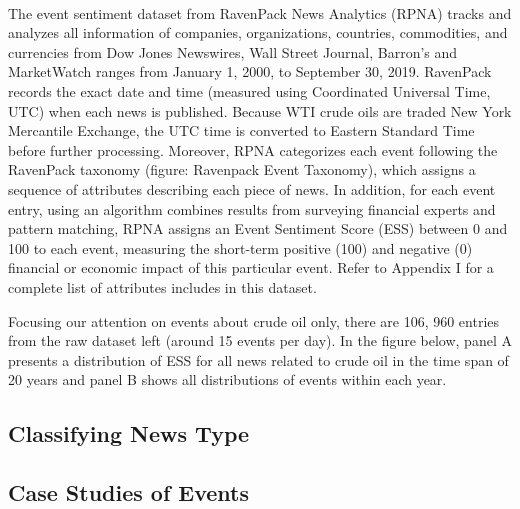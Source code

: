 \documentclass[12pt]{article}
\begin{document}
	\paragraph{} The event sentiment dataset from RavenPack News Analytics (RPNA) tracks and analyzes all information of companies, organizations, countries, commodities, and currencies from Dow Jones Newswires, Wall Street Journal, Barron’s and MarketWatch ranges from January 1, 2000, to September 30, 2019. RavenPack records the exact date and time (measured using Coordinated Universal Time, UTC)  when each news is published. Because WTI crude oils are traded New York Mercantile Exchange, the UTC time is converted to Eastern Standard Time before further processing. Moreover, RPNA categorizes each event following the RavenPack taxonomy (figure: Ravenpack Event Taxonomy), which assigns a sequence of attributes describing each piece of news. In addition, for each event entry, using an algorithm combines results from surveying financial experts and pattern matching, RPNA assigns an Event Sentiment Score (ESS) between 0 and 100 to each event, measuring the short-term positive (100) and negative (0) financial or economic impact of this particular event. Refer to Appendix I for a complete list of attributes includes in this dataset.

	\par Focusing our attention on events about crude oil only, there are 106, 960 entries from the raw dataset left (around 15 events per day). In the figure below, panel A presents a distribution of ESS for all news related to crude oil in the time span of 20 years and panel B shows all distributions of events within each year.


	\subsection{Classifying News Type}
	
	\subsection{Case Studies of Events}
\end{document}
